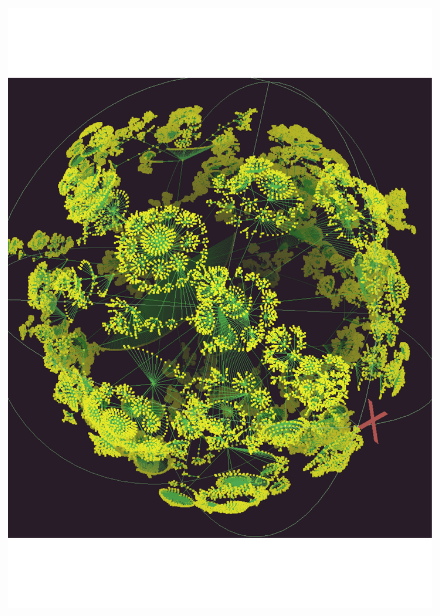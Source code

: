 \documentclass[aps, rmp, twocolumn, amsmath, amssymb, nofootinbib, superscriptaddress, longbibliography, floatfix, table-of-contents, eqsecnum]{revtex4-1}
\begin{document}
\begin{figure}[!htb]
\includegraphics[width=\columnwidth]{webgraph_1} \\

\end{figure}
\end{document}
